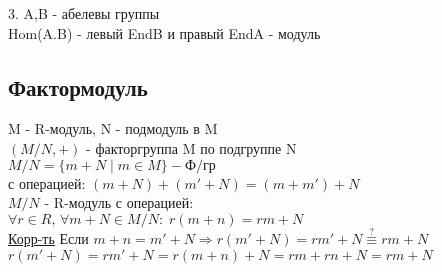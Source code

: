 \documentclass[12pt]{article}
\begin{document}
3. A,B  - абелевы группы \\ 
Hom(A.B) - левый EndB и правый EndA - модуль\\

\subsection*{Фактормодуль}
M - R-модуль, N - подмодуль в M \\
$ (M/N ,+)$ - факторгруппа M по подгруппе N \\
$ M/N = \{m+N \; | \; m \in M \} - \text{Ф/гр} $ \\
с операцией: $ (m+N) + (m' + N) = (m + m') + N $ \\
$ M/N $ - R-модуль с операцией: \\
$ \forall r \in R, \, \forall m+N \in M/N: \; r(m+n) = rm + N $\\
\underline{Корр-ть} Если $m+n = m' + N \Rightarrow r(m'+ N) = rm' + N 
\stackrel{?}{\equiv} rm + N $ \\
$ r(m' + N) = rm' + N = r(m+n)+N = rm + rn + N = rm+ N$\\
\end{document}
